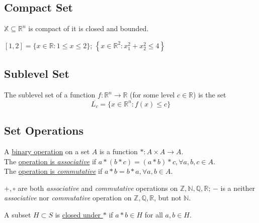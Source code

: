 \documentclass[11pt]{elegantbook}
\begin{document}
\subsection{Compact Set}
\begin{definition}
    \normalfont
    $\mathbb{X} \subseteq \mathbb{R}^{n}$ is compact of it is closed and bounded.
\end{definition}

\begin{example}
    \normalfont
    $[1,2]=\{x \in \mathbb{R}: 1 \leqslant x \leqslant 2\}$; $\left\{x \in \mathbb{R}^{2}\right.: \left.x_{1}^{2}+x_{2}^{2} \leqslant 4\right\}$
\end{example}

\subsection{Sublevel Set}
\begin{definition}
    \normalfont
    The sublevel set of a function $f: \mathbb{R}^n \rightarrow \mathbb{R}$ (for some level $c\in \mathbb{R}$) is the set $$\overline{L_c}=\{x\in \mathbb{R}^n:f(x)\leq c\}$$
\end{definition}



\subsection{Set Operations}
\begin{definition}
    \normalfont
    A \underline{binary operation} on a set $A$ is a function $*:A\times A \rightarrow A$.\\
    The \underline{operation is \textit{associative}} if $a*(b*c)=(a*b)*c, \forall a,b,c\in A$.\\
    The \underline{operation is \textit{commutative}} if $a*b=b*a, \forall a,b\in A$.
\end{definition}

\begin{example}

${+,\circ}$ are both \textit{associative} and \textit{commutative} operations on $\mathbb{Z},\mathbb{N},\mathbb{Q},\mathbb{R}$; $-$ is a neither \textit{associative} nor \textit{commutative} operation on $\mathbb{Z},\mathbb{Q},\mathbb{R}$, but not $\mathbb{N}$.
\end{example}

\begin{definition}
A subset $H\subset S$ is \underline{closed under $*$} if $a*b\in H$ for all $a,b\in H$.
\end{definition}
\end{document}
